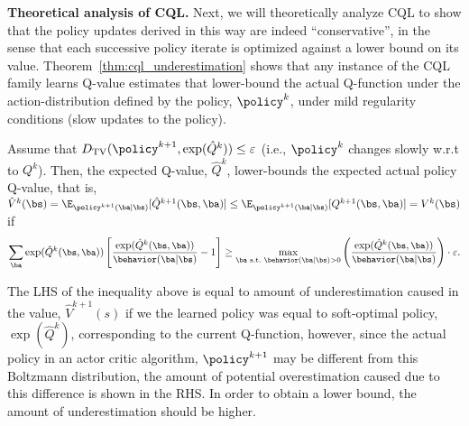 \textbf{Theoretical analysis of CQL.}
Next, we will theoretically analyze CQL to show that the policy updates derived in this way are indeed ``conservative'', in the sense that each successive policy iterate is optimized against a lower bound on its value. Theorem~\ref{thm:cql_underestimation} shows that any instance of the CQL family learns Q-value estimates that lower-bound the actual Q-function under the action-distribution defined by the policy, $\policy^{k}$, under mild regularity conditions (slow updates to the policy).
\begin{theorem}
\label{thm:cql_underestimation}
Assume that $D_{\mathrm{TV}}(\policy^{k+1}, \exp(\hat{Q}^k)) \leq \varepsilon$ (i.e., $\policy^k$ changes slowly w.r.t to $Q^k$). Then, the expected Q-value, $\hat{Q}^k$, lower-bounds the expected actual policy Q-value, that is, $\hat{V}^k(\bs) = \E_{ \policy^{k+1}(\ba|\bs)}[\hat{Q}^{k+1}(\bs, \ba)] \leq \E_{\policy^{k+1}(\ba|\bs)}[Q^{k+1}(\bs, \ba)] = V^k(\bs)$ if
\begin{equation*}
\small{\sum_{\ba} \exp(\hat{Q}^k(\bs, \ba)) \left[ \frac{\exp(\hat{Q}^k(\bs, \ba))}{\behavior(\ba|\bs)} -1 \right] \geq \max_{\ba \text{~s.t.~} \behavior(\ba|\bs) > 0} \left(\frac{\exp(\hat{Q}^k(\bs, \ba))}{\behavior(\ba|\bs)} \right) \cdot \varepsilon}. 
\end{equation*}
\end{theorem}
The LHS of the inequality above is equal to amount of underestimation caused in the value, $\hat{V}^{k+1}(s)$ if we the learned policy was equal to soft-optimal policy, $\exp(\hat{Q}^k)$, corresponding to the current Q-function, however, since the actual policy in an actor critic algorithm, $\policy^{k+1}$ may be different from this Boltzmann distribution, the amount of potential overestimation caused due to this difference is shown in the RHS. In order to obtain a lower bound, the amount of underestimation should be higher.  

